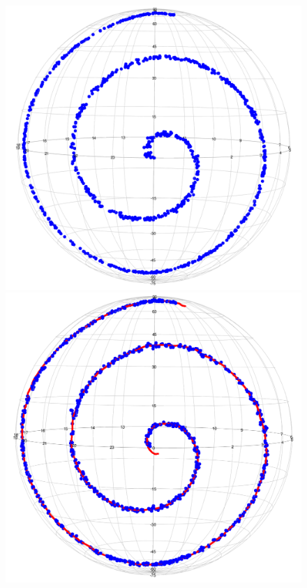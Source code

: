 \begin{figure}[h]
    \centering
    \includegraphics[scale=0.1]{figures/spiral.png}
    \hspace{0cm}
    \includegraphics[scale=0.1]{figures/LPG(spiral).png}
    \hspace{0cm}

\end{figure}
